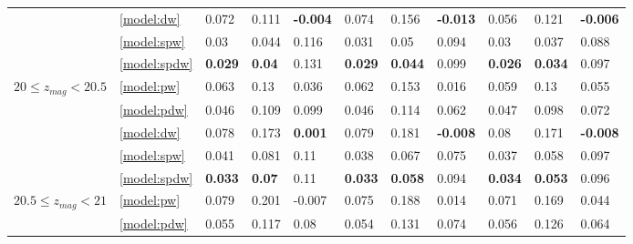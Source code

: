 \documentclass[fleqn,usenatbib]{mnras}
\begin{document}
\begin{table}
\begin{tabular}{lllllllllll}
                                   & \ref{model:dw} &                0.072 &           0.111 &  \textbf{-0.004} &            0.074 &           0.156 &  \textbf{-0.013} &            0.056 &           0.121 &  \textbf{-0.006} \\
                                   & \ref{model:spw} &                 0.03 &           0.044 &            0.116 &            0.031 &            0.05 &            0.094 &             0.03 &           0.037 &            0.088 \\
                                   & \ref{model:spdw} &       \textbf{0.029} &   \textbf{0.04} &            0.131 &   \textbf{0.029} &  \textbf{0.044} &            0.099 &   \textbf{0.026} &  \textbf{0.034} &            0.097 \\
\hline
            $20 \leq z_{mag} < 20.5$ & \ref{model:pw} &                0.063 &            0.13 &            0.036 &            0.062 &           0.153 &            0.016 &            0.059 &            0.13 &            0.055 \\
                                   & \ref{model:pdw} &                0.046 &           0.109 &            0.099 &            0.046 &           0.114 &            0.062 &            0.047 &           0.098 &            0.072 \\
                                   & \ref{model:dw} &                0.078 &           0.173 &   \textbf{0.001} &            0.079 &           0.181 &  \textbf{-0.008} &             0.08 &           0.171 &  \textbf{-0.008} \\
                                   & \ref{model:spw} &                0.041 &           0.081 &             0.11 &            0.038 &           0.067 &            0.075 &            0.037 &           0.058 &            0.097 \\
                                   & \ref{model:spdw} &       \textbf{0.033} &   \textbf{0.07} &             0.11 &   \textbf{0.033} &  \textbf{0.058} &            0.094 &   \textbf{0.034} &  \textbf{0.053} &            0.096 \\
\hline
            $20.5 \leq z_{mag} < 21$ & \ref{model:pw} &                0.079 &           0.201 &           -0.007 &            0.075 &           0.188 &            0.014 &            0.071 &           0.169 &            0.044 \\
                                   & \ref{model:pdw} &                0.055 &           0.117 &             0.08 &            0.054 &           0.131 &            0.074 &            0.056 &           0.126 &            0.064 \\

\end{tabular}
\end{table}
\end{document}
